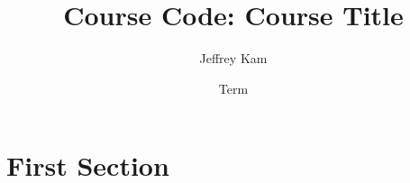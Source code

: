 \documentclass[lecture]{twl}
\title{Course Code: Course Title}
\date{Term}
\author{Jeffrey Kam}
\begin{document}
\maketitle
\tableofcontents
\newpage

\newpage
\section{First Section}

\printindex
\end{document}
